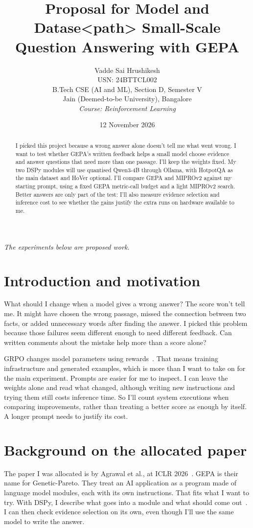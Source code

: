 \documentclass[11pt,a4paper]{article}
\title{\Large\bfseries Proposal for Model and Datase<path>
Small-Scale Question Answering with GEPA}
\author{Vadde Sai Hrushikesh\\USN: 24BTTCL002\\
B.Tech CSE (AI and ML), Section D, Semester V\\
Jain (Deemed-to-be University), Bangalore\\
\textit{Course: Reinforcement Learning}}
\date{12 November 2026}
\begin{document}
\maketitle
\vspace{-1.4em}
\begin{center}
\small\textit{The experiments below are proposed work.}
\end{center}

\begin{abstract}
I picked this project because a wrong answer alone doesn't tell me what went wrong. I want to test whether GEPA's written feedback helps a small model choose evidence and answer questions that need more than one passage. I'll keep the weights fixed. My two DSPy modules will use quantised Qwen3-4B through Ollama, with HotpotQA as the main dataset and HoVer optional. I'll compare GEPA and MIPROv2 against my starting prompt, using a fixed GEPA metric-call budget and a light MIPROv2 search. Better answers are only part of the test: I'll also measure evidence selection and inference cost to see whether the gains justify the extra runs on hardware available to me.
\end{abstract}

\section{Introduction and motivation}
What should I change when a model gives a wrong answer? The score won't tell me. It might have chosen the wrong passage, missed the connection between two facts, or added unnecessary words after finding the answer. I picked this problem because those failures seem different enough to need different feedback. Can written comments about the mistake help more than a score alone?

GRPO changes model parameters using rewards~\cite{grpo}. That means training infrastructure and generated examples, which is more than I want to take on for the main experiment. Prompts are easier for me to inspect. I can leave the weights alone and read what changed, although writing new instructions and trying them still costs inference time. So I'll count system executions when comparing improvements, rather than treating a better score as enough by itself. A longer prompt needs to justify its cost.

\section{Background on the allocated paper}
The paper I was allocated is by Agrawal et al., at ICLR 2026~\cite{gepa}. GEPA is their name for Genetic-Pareto. They treat an AI application as a program made of language model modules, each with its own instructions. That fits what I want to try. With DSPy, I describe what goes into a module and what should come out~\cite{dspy}. I can then check evidence selection on its own, even though I'll use the same model to write the answer.
\end{document}
